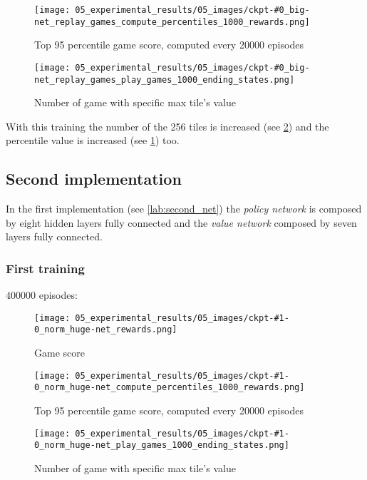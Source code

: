 \begin{figure}[htbp]
\centerline{\texttt{[image: 05\_experimental\_results/05\_images/ckpt-\#0\_big-net\_replay\_games\_compute\_percentiles\_1000\_rewards.png]}}
\caption{Top 95 percentile game score, computed every 20000 episodes}
\label{fig:0-2_percentile}
\end{figure}

\begin{figure}[htbp]
\centerline{\texttt{[image: 05\_experimental\_results/05\_images/ckpt-\#0\_big-net\_replay\_games\_play\_games\_1000\_ending\_states.png]}}
\caption{Number of game with specific max tile's value}
\label{fig:0-2_end_state}
\end{figure}

With this training the number of the 256 tiles is increased (see \ref{fig:0-2_end_state}) and the percentile value is increased (see \ref{fig:0-2_percentile}) too.

\subsection{Second implementation}
In the first implementation (see \ref{lab:second_net}) the \textit{policy network} is composed by eight hidden layers fully connected and the \textit{value network} composed by seven layers fully connected.

\subsubsection{First training}
$400000$ episodes:
\begin{figure}[htbp]
\centerline{\texttt{[image: 05\_experimental\_results/05\_images/ckpt-\#1-0\_norm\_huge-net\_rewards.png]}}
\caption{Game score}
\label{fig:1-0_reward}
\end{figure}

\begin{figure}[htbp]
\centerline{\texttt{[image: 05\_experimental\_results/05\_images/ckpt-\#1-0\_norm\_huge-net\_compute\_percentiles\_1000\_rewards.png]}}
\caption{Top 95 percentile game score, computed every 20000 episodes}
\label{fig:1-0_percentile}
\end{figure}

\begin{figure}[htbp]
\centerline{\texttt{[image: 05\_experimental\_results/05\_images/ckpt-\#1-0\_norm\_huge-net\_play\_games\_1000\_ending\_states.png]}}
\caption{Number of game with specific max tile's value}
\label{fig:1-0_end_state}
\end{figure}

